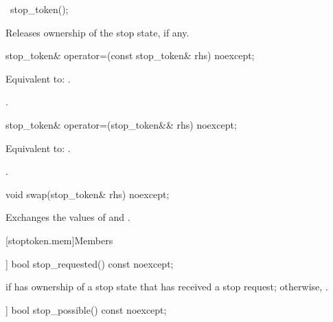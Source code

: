 %
\begin{itemdecl}
~stop_token();
\end{itemdecl}

\begin{itemdescr}
\pnum
\effects
Releases ownership of the stop state, if any.
\end{itemdescr}

%
\begin{itemdecl}
stop_token& operator=(const stop_token& rhs) noexcept;
\end{itemdecl}

\begin{itemdescr}
\pnum
\effects
Equivalent to: .

\pnum
\returns
{}.
\end{itemdescr}

%
\begin{itemdecl}
stop_token& operator=(stop_token&& rhs) noexcept;
\end{itemdecl}

\begin{itemdescr}
\pnum
\effects
Equivalent to: .

\pnum
\returns
{}.
\end{itemdescr}

%
\begin{itemdecl}
void swap(stop_token& rhs) noexcept;
\end{itemdecl}

\begin{itemdescr}
\pnum
\effects
Exchanges the values of  and .
\end{itemdescr}

[stoptoken.mem]{Members}

%
\begin{itemdecl}
[[nodiscard]] bool stop_requested() const noexcept;
\end{itemdecl}

\begin{itemdescr}
\pnum
\returns
{} if  has ownership of a stop state
that has received a stop request;
otherwise, .
\end{itemdescr}

%
\begin{itemdecl}
[[nodiscard]] bool stop_possible() const noexcept;
\end{itemdecl}

